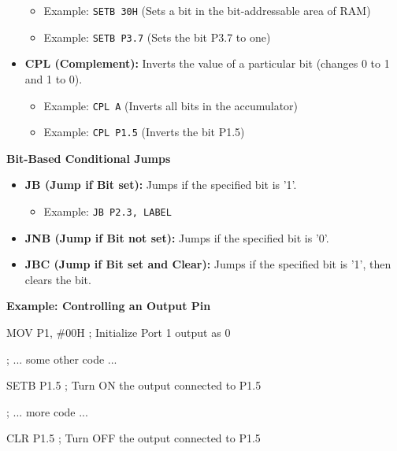 \documentclass[
]{article}
\newenvironment{Shaded}{}{}
\newcommand{\NormalTok}[1]{#1}
\begin{document}
\begin{itemize}
  \begin{itemize}
  \item
    Example: \texttt{SETB\ 30H} (Sets a bit in the bit-addressable area
    of RAM)
  \item
    Example: \texttt{SETB\ P3.7} (Sets the bit P3.7 to one)
  \end{itemize}
\item
  \textbf{CPL (Complement):} Inverts the value of a particular bit
  (changes 0 to 1 and 1 to 0).

  \begin{itemize}
  \item
    Example: \texttt{CPL\ A} (Inverts all bits in the accumulator)
  \item
    Example: \texttt{CPL\ P1.5} (Inverts the bit P1.5)
  \end{itemize}
\end{itemize}

\textbf{Bit-Based Conditional Jumps}

\begin{itemize}
\item
  \textbf{JB (Jump if Bit set):} Jumps if the specified bit is '1'.

  \begin{itemize}
  \item
    Example: \texttt{JB\ P2.3,\ LABEL}
  \end{itemize}
\item
  \textbf{JNB (Jump if Bit not set):} Jumps if the specified bit is '0'.
\item
  \textbf{JBC (Jump if Bit set and Clear):} Jumps if the specified bit
  is '1', then clears the bit.
\end{itemize}

\textbf{Example: Controlling an Output Pin}

\begin{Shaded}
\begin{Highlighting}[]
\NormalTok{MOV P1, \#00H    ; Initialize Port 1 output as 0}

\NormalTok{; ... some other code ...}

\NormalTok{SETB P1.5       ; Turn ON the output connected to P1.5}

\NormalTok{; ... more code ...}

\NormalTok{CLR P1.5       ; Turn OFF the output connected to P1.5}
\end{Highlighting}
\end{Shaded}
\end{document}
